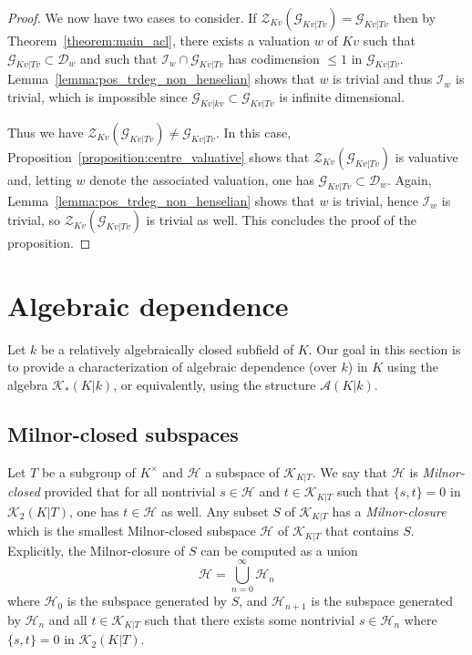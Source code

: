 \documentclass[12pt]{amsart}
\newcommand{\Ascr}{\mathscr{A}}
\newcommand{\Zcal}{\mathcal{Z}}
\newcommand{\Gcal}{\mathcal{G}}
\newcommand{\Dcal}{\mathcal{D}}
\newcommand{\Ical}{\mathcal{I}}
\newcommand{\Hcal}{\mathcal{H}}
\newcommand{\Kcal}{\mathcal{K}}
\theoremstyle{definition}
\begin{document}
\begin{proof}
  We now have two cases to consider.
  If $\Zcal_{Kv}(\Gcal_{Kv|Tv}) = \Gcal_{Kv|Tv}$ then by Theorem~\ref{theorem:main_acl}, there exists a valuation $w$ of $Kv$ such that $\Gcal_{Kv|Tv} \subset \Dcal_{w}$ and such that $\Ical_{w} \cap \Gcal_{Kv|Tv}$ has codimension $\le 1$ in $\Gcal_{Kv|Tv}$.
  Lemma~\ref{lemma:pos_trdeg_non_henselian} shows that $w$ is trivial and thus $\Ical_{w}$ is trivial, which is impossible since $\Gcal_{Kv|kv} \subset \Gcal_{Kv|Tv}$ is infinite dimensional.

  Thus we have $\Zcal_{Kv}(\Gcal_{Kv|Tv}) \neq \Gcal_{Kv|Tv}$.
  In this case, Proposition~\ref{proposition:centre_valuative} shows that $\Zcal_{Kv}(\Gcal_{Kv|Tv})$ is valuative and, letting $w$ denote the associated valuation, one has $\Gcal_{Kv|Tv} \subset \Dcal_{w}$.
  Again, Lemma~\ref{lemma:pos_trdeg_non_henselian} shows that $w$ is trivial, hence $\Ical_{w}$ is trivial, so $\Zcal_{Kv}(\Gcal_{Kv|Tv})$ is trivial as well.
  This concludes the proof of the proposition.
\end{proof}

\section{Algebraic dependence}\label{section:algebraic_dependence}

Let $k$ be a relatively algebraically closed subfield of $K$.
Our goal in this section is to provide a characterization of algebraic dependence (over $k$) in $K$ using the algebra $\Kcal_{*}(K|k)$, or equivalently, using the structure $\Ascr(K|k)$.

\subsection{Milnor-closed subspaces}

Let $T$ be a subgroup of $K^{\times}$ and $\Hcal$ a subspace of $\Kcal_{K|T}$.
We say that $\Hcal$ is \emph{Milnor-closed} provided that for all nontrivial $s \in \Hcal$ and $t \in \Kcal_{K|T}$ such that $\{s,t\} = 0$ in $\Kcal_{2}(K|T)$, one has $t \in \Hcal$ as well.
Any subset $S$ of $\Kcal_{K|T}$ has a \emph{Milnor-closure} which is the smallest Milnor-closed subspace $\Hcal$ of $\Kcal_{K|T}$ that contains $S$.
Explicitly, the Milnor-closure of $S$ can be computed as a union
\[ \Hcal = \bigcup_{n = 0}^{\infty} \Hcal_{n} \]
where $\Hcal_{0}$ is the subspace generated by $S$, and $\Hcal_{n+1}$ is the subspace generated by $\Hcal_{n}$ and all $t \in \Kcal_{K|T}$ such that there exists some nontrivial $s \in \Hcal_{n}$ where $\{s,t\} = 0$ in $\Kcal_{2}(K|T)$.
\end{document}
